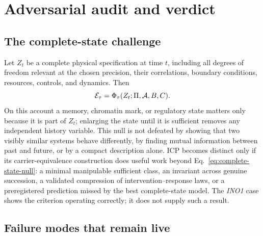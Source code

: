 \section{Adversarial audit and verdict}
\label{sec:audit}

\subsection{The complete-state challenge}

Let $Z_t$ be a complete physical specification at time $t$, including all
degrees of freedom relevant at the chosen precision, their correlations,
boundary conditions, resources, controls, and dynamics. Then
\begin{equation}
  \mathcal{E}_{\tau}=\Phi_{\tau}(Z_t;\Pi,\mathcal A,B,C).
  \label{eq:complete-state-null}
\end{equation}
On this account a memory, chromatin mark, or regulatory state matters only
because it is part of $Z_t$; enlarging the state until it is sufficient removes
any independent history variable. This null is not defeated by showing that two
visibly similar systems behave differently, by finding mutual information
between past and future, or by a compact description alone. ICP becomes
distinct only if its carrier-equivalence construction does useful work beyond
Eq.~\eqref{eq:complete-state-null}: a minimal manipulable sufficient class, an
invariant across genuine succession, a validated compression of
intervention--response laws, or a preregistered prediction missed by the best
complete-state model. The \textit{INO1} case shows the criterion operating
correctly; it does not supply such a result.

\subsection{Failure modes that remain live}

